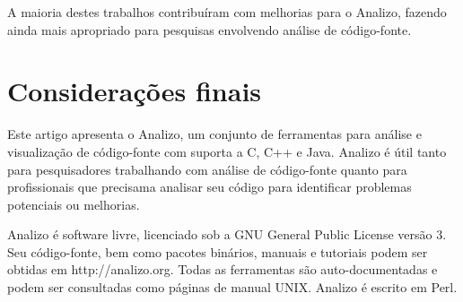 \documentclass{article}
\begin{document}
A maioria destes trabalhos contribuíram com melhorias para o Analizo, fazendo
ainda mais apropriado para pesquisas envolvendo análise de código-fonte.

\section{Considerações finais}

Este artigo apresenta o Analizo, um conjunto de ferramentas para análise e visualização
de código-fonte com suporta a C, C++ e Java. Analizo é útil tanto para pesquisadores
trabalhando com análise de código-fonte quanto para profissionais que precisama analisar
seu código para identificar problemas potenciais ou melhorias.

Analizo é software livre, licenciado sob a GNU General Public License versão
3. Seu código-fonte, bem como pacotes binários, manuais e tutoriais podem ser
obtidas em http://analizo.org. Todas as ferramentas são auto-documentadas e podem
ser consultadas como páginas de manual UNIX. Analizo é escrito em Perl.


\appendix
\end{document}

